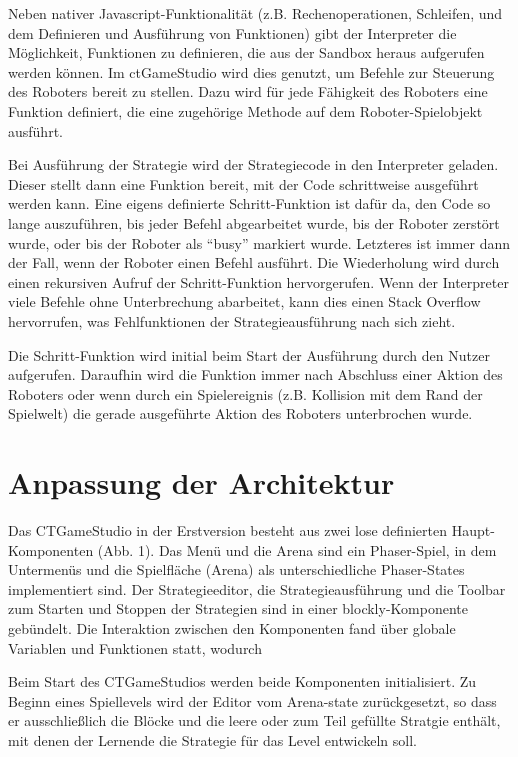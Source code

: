 Neben nativer Javascript-Funktionalität (z.B. Rechenoperationen, Schleifen, und dem Definieren und
Ausführung von Funktionen) gibt der Interpreter die Möglichkeit, Funktionen zu definieren, die aus
der Sandbox heraus aufgerufen werden können. Im ctGameStudio wird dies genutzt, um Befehle zur
Steuerung des Roboters bereit zu stellen. Dazu wird für jede Fähigkeit des Roboters eine Funktion
definiert, die eine zugehörige Methode auf dem Roboter-Spielobjekt ausführt.

Bei Ausführung der Strategie wird der Strategiecode in den Interpreter geladen. Dieser stellt dann
eine Funktion bereit, mit der Code schrittweise ausgeführt werden kann. Eine eigens definierte
Schritt-Funktion ist dafür da, den Code so lange auszuführen, bis jeder Befehl abgearbeitet wurde,
bis der Roboter zerstört wurde, oder bis der Roboter als \enquote{busy} markiert wurde. Letzteres
ist immer dann der Fall, wenn der Roboter einen Befehl ausführt. Die Wiederholung wird durch einen
rekursiven Aufruf der Schritt-Funktion hervorgerufen. Wenn der Interpreter viele Befehle ohne
Unterbrechung abarbeitet, kann dies einen Stack Overflow hervorrufen, was Fehlfunktionen der
Strategieausführung nach sich zieht.

Die Schritt-Funktion wird initial beim Start der Ausführung durch den Nutzer aufgerufen. Daraufhin
wird die Funktion immer nach Abschluss einer Aktion des Roboters oder wenn durch ein Spielereignis
(z.B. Kollision mit dem Rand der Spielwelt) die gerade ausgeführte Aktion des Roboters unterbrochen
wurde.


\section{Anpassung der Architektur}

Das CTGameStudio in der Erstversion besteht aus zwei lose definierten Haupt-Komponenten (Abb. 1).
Das Menü und die Arena sind ein Phaser-Spiel, in dem Untermenüs und die Spielfläche (Arena) als
unterschiedliche Phaser-States implementiert sind. Der Strategieeditor, die Strategieausführung und
die Toolbar zum Starten und Stoppen der Strategien sind in einer blockly-Komponente gebündelt. Die
Interaktion zwischen den Komponenten fand über globale Variablen und Funktionen statt, wodurch

Beim Start des CTGameStudios werden beide Komponenten initialisiert. Zu Beginn eines Spiellevels
wird der Editor vom Arena-state zurückgesetzt, so dass er ausschließlich die Blöcke und die leere
oder zum Teil gefüllte Stratgie enthält, mit denen der Lernende die Strategie für das Level
entwickeln soll.

